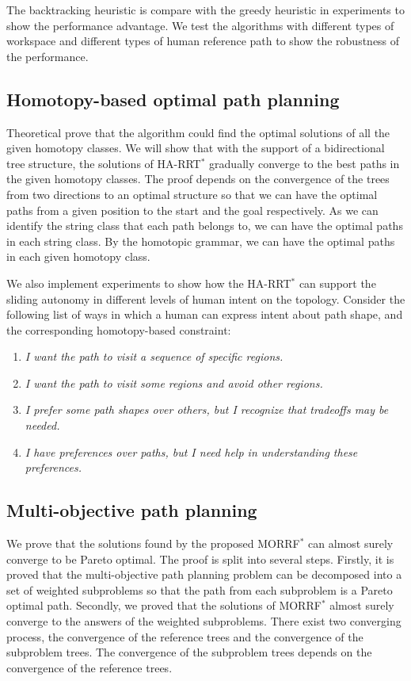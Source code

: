 \documentclass[phd]{byuprop}
\begin{document}
The backtracking heuristic is compare with the greedy heuristic in experiments to show the performance advantage.
We test the algorithms with different types of workspace and different types of human reference path to show the robustness of the performance.


\subsection{Homotopy-based optimal path planning}

Theoretical prove that the algorithm could find the optimal solutions of all the given homotopy classes.
We will show that with the support of a bidirectional tree structure, the solutions of HA-RRT$^{*}$ gradually converge to the best paths in the given homotopy classes.
The proof depends on the convergence of the trees from two directions to an optimal structure so that we can have the optimal paths from a given position to the start and the goal respectively.
As we can identify the string class that each path belongs to, we can have the optimal paths in each string class.
By the homotopic grammar, we can have the optimal paths in each given homotopy class.

We also implement experiments to show how the HA-RRT$^{*}$ can support the sliding autonomy in different levels of human intent on the topology.
Consider the following list of ways in which a human can express intent about path shape, and the corresponding homotopy-based constraint:
\begin{enumerate}
\item \emph{I want the path to visit a sequence of specific regions.}
\item \emph{I want the path to visit some regions and avoid other regions.}
\item \emph{I prefer some path shapes over others, but I recognize that tradeoffs may be needed.} 
\item \emph{I have preferences over paths, but I need help in understanding these preferences.}
\end{enumerate}

\subsection{Multi-objective path planning}

We prove that the solutions found by the proposed MORRF$^{*}$ can almost surely converge to be Pareto optimal.
The proof is split into several steps.
Firstly, it is proved that the multi-objective path planning problem can be decomposed into a set of weighted subproblems so that the path from each subproblem is a Pareto optimal path.
Secondly, we proved that the solutions of MORRF$^{*}$ almost surely converge to the answers of the weighted subproblems.
There exist two converging process, the convergence of the reference trees and the convergence of the subproblem trees.
The convergence of the subproblem trees depends on the convergence of the reference trees.
\end{document}
